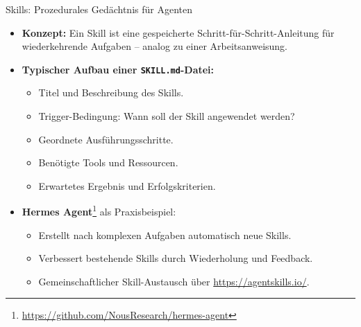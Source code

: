 \documentclass[aspectratio=1610, xcolor=dvipsnames, 9pt]{beamer}
\begin{document}
\begin{frame}{Skills: Prozedurales Gedächtnis für Agenten}
  \begin{itemize}
    \item \textbf{Konzept:} Ein Skill ist eine gespeicherte Schritt-für-Schritt-Anleitung für wiederkehrende Aufgaben -- analog zu einer Arbeitsanweisung.
    \item \textbf{Typischer Aufbau einer \texttt{SKILL.md}-Datei:}
      \begin{itemize}
        \item Titel und Beschreibung des Skills.
        \item Trigger-Bedingung: Wann soll der Skill angewendet werden?
        \item Geordnete Ausführungsschritte.
        \item Benötigte Tools und Ressourcen.
        \item Erwartetes Ergebnis und Erfolgskriterien.
      \end{itemize}
    \item \textbf{Hermes Agent}\footnote{\url{https://github.com/NousResearch/hermes-agent}} als Praxisbeispiel:
      \begin{itemize}
        \item Erstellt nach komplexen Aufgaben automatisch neue Skills.
        \item Verbessert bestehende Skills durch Wiederholung und Feedback.
        \item Gemeinschaftlicher Skill-Austausch über \url{https://agentskills.io/}.
      \end{itemize}
  \end{itemize}
\end{frame}
\end{document}
